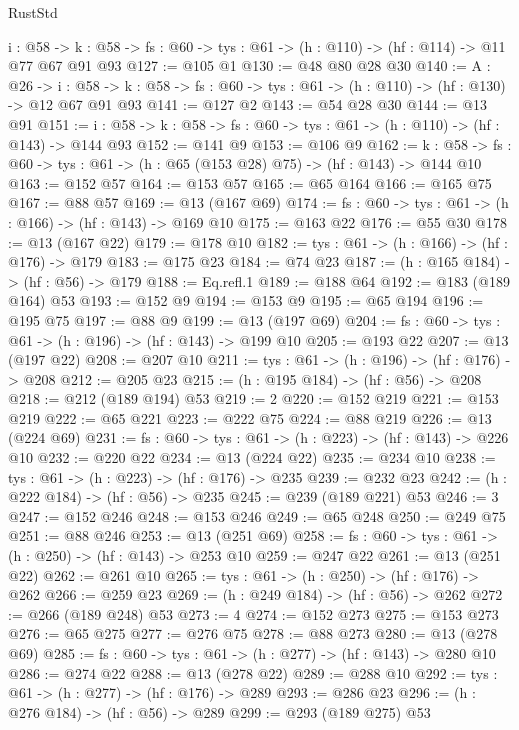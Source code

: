 \begin{lexlean}{RustStd}
\begin{coremodule}
{\begin{coremodule}
{{{{{{{{{{{{{{{{{{{{{{{{{{{{{{{{{{{{{{  {i : @58} ->
  {k : @58} -> {fs : @60} -> {tys : @61} -> (h : @110) -> (hf : @114) -> @11 @77 @67 @91 @93
@127 := @105 @1
@130 := @48 @80 @28 @30
@140 := {A : @26} ->
  {i : @58} ->
  {k : @58} -> {fs : @60} -> {tys : @61} -> (h : @110) -> (hf : @130) -> @12 @67 @91 @93
@141 := @127 @2
@143 := @54 @28 @30
@144 := @13 @91
@151 := {i : @58} -> {k : @58} -> {fs : @60} -> {tys : @61} -> (h : @110) -> (hf : @143) -> @144 @93
@152 := @141 @9
@153 := @106 @9
@162 := {k : @58} ->
  {fs : @60} -> {tys : @61} -> (h : @65 (@153 @28) @75) -> (hf : @143) -> @144 @10
@163 := @152 @57
@164 := @153 @57
@165 := @65 @164
@166 := @165 @75
@167 := @88 @57
@169 := @13 (@167 @69)
@174 := {fs : @60} -> {tys : @61} -> (h : @166) -> (hf : @143) -> @169 @10
@175 := @163 @22
@176 := @55 @30
@178 := @13 (@167 @22)
@179 := @178 @10
@182 := {tys : @61} -> (h : @166) -> (hf : @176) -> @179
@183 := @175 @23
@184 := @74 @23
@187 := (h : @165 @184) -> (hf : @56) -> @179
@188 := Eq.refl.{1}
@189 := @188 @64
@192 := @183 (@189 @164) @53
@193 := @152 @9
@194 := @153 @9
@195 := @65 @194
@196 := @195 @75
@197 := @88 @9
@199 := @13 (@197 @69)
@204 := {fs : @60} -> {tys : @61} -> (h : @196) -> (hf : @143) -> @199 @10
@205 := @193 @22
@207 := @13 (@197 @22)
@208 := @207 @10
@211 := {tys : @61} -> (h : @196) -> (hf : @176) -> @208
@212 := @205 @23
@215 := (h : @195 @184) -> (hf : @56) -> @208
@218 := @212 (@189 @194) @53
@219 := 2
@220 := @152 @219
@221 := @153 @219
@222 := @65 @221
@223 := @222 @75
@224 := @88 @219
@226 := @13 (@224 @69)
@231 := {fs : @60} -> {tys : @61} -> (h : @223) -> (hf : @143) -> @226 @10
@232 := @220 @22
@234 := @13 (@224 @22)
@235 := @234 @10
@238 := {tys : @61} -> (h : @223) -> (hf : @176) -> @235
@239 := @232 @23
@242 := (h : @222 @184) -> (hf : @56) -> @235
@245 := @239 (@189 @221) @53
@246 := 3
@247 := @152 @246
@248 := @153 @246
@249 := @65 @248
@250 := @249 @75
@251 := @88 @246
@253 := @13 (@251 @69)
@258 := {fs : @60} -> {tys : @61} -> (h : @250) -> (hf : @143) -> @253 @10
@259 := @247 @22
@261 := @13 (@251 @22)
@262 := @261 @10
@265 := {tys : @61} -> (h : @250) -> (hf : @176) -> @262
@266 := @259 @23
@269 := (h : @249 @184) -> (hf : @56) -> @262
@272 := @266 (@189 @248) @53
@273 := 4
@274 := @152 @273
@275 := @153 @273
@276 := @65 @275
@277 := @276 @75
@278 := @88 @273
@280 := @13 (@278 @69)
@285 := {fs : @60} -> {tys : @61} -> (h : @277) -> (hf : @143) -> @280 @10
@286 := @274 @22
@288 := @13 (@278 @22)
@289 := @288 @10
@292 := {tys : @61} -> (h : @277) -> (hf : @176) -> @289
@293 := @286 @23
@296 := (h : @276 @184) -> (hf : @56) -> @289
@299 := @293 (@189 @275) @53
}}}}}}}}}}}}}}}}}}}}}}}}}}}}}}}}}}}}}}
\end{coremodule}}
\end{coremodule}
\end{lexlean}
